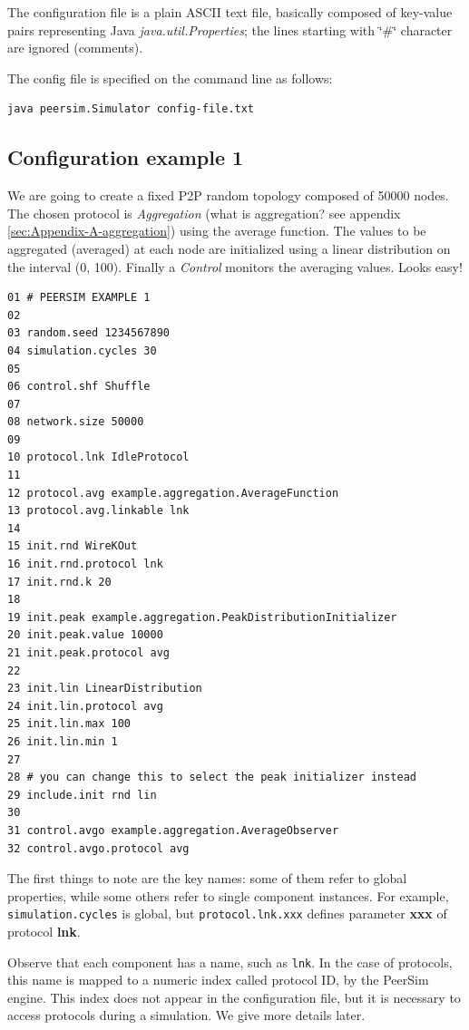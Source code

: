 \documentclass[a4paper,11pt]{article}
\begin{document}
The configuration file is a plain ASCII text file, basically composed of
key-value pairs representing Java \emph{java.util.Properties}; the lines 
starting with  \char`\"{}\#\char`\"{} character are ignored (comments). 

The config file is specified on the command line as follows:

\begin{verbatim}
java peersim.Simulator config-file.txt 
\end{verbatim}

\subsection{Configuration example 1}

We are going to create a fixed P2P random topology composed of 50000
nodes.
The chosen protocol is \emph{Aggregation} (what is
aggregation? see appendix \ref{sec:Appendix-A-aggregation}) using
the average function. The values to be aggregated (averaged) at each
node are initialized using a linear distribution on the interval (0,
100). Finally a \emph{Control} monitors the averaging values.
Looks easy!

\footnotesize
\begin{verbatim}
01 # PEERSIM EXAMPLE 1
02
03 random.seed 1234567890
04 simulation.cycles 30
05
06 control.shf Shuffle
07
08 network.size 50000
09 
10 protocol.lnk IdleProtocol
11
12 protocol.avg example.aggregation.AverageFunction
13 protocol.avg.linkable lnk
14 
15 init.rnd WireKOut
16 init.rnd.protocol lnk
17 init.rnd.k 20
18
19 init.peak example.aggregation.PeakDistributionInitializer
20 init.peak.value 10000
21 init.peak.protocol avg
22
23 init.lin LinearDistribution
24 init.lin.protocol avg
25 init.lin.max 100
26 init.lin.min 1
27
28 # you can change this to select the peak initializer instead
29 include.init rnd lin
30
31 control.avgo example.aggregation.AverageObserver
32 control.avgo.protocol avg
\end{verbatim}

\normalsize


The first things to note are the
key names: some of them refer to global properties, while some
others refer to single component instances. For example,
\texttt{simulation.cycles} is global, but \texttt{protocol.lnk.xxx}
defines parameter \textbf{xxx} of protocol \textbf{lnk}.

Observe that each component has a name,
such as \texttt{lnk}. In the case of protocols, this
name is mapped to a numeric index called protocol ID, by the PeerSim
engine.
This index does not appear in the configuration file, but it is necessary
to access protocols during a simulation.
We give more details later.
\end{document}
